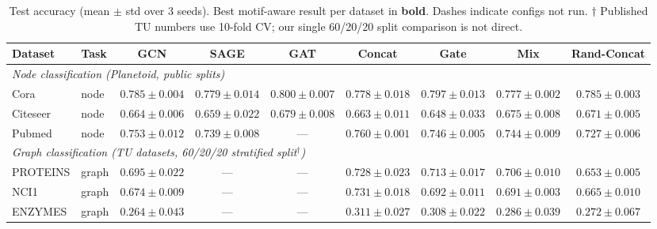 
\begin{table}[t]
\centering
\caption{Test accuracy (mean $\pm$ std over 3 seeds). Best motif-aware result per dataset in \textbf{bold}. Dashes indicate configs not run. $\dagger$ Published TU numbers use 10-fold CV; our single 60/20/20 split comparison is not direct.}
\label{tab:main_results}
\setlength{\tabcolsep}{4pt}
\begin{tabular}{llccccccc}
\toprule
\textbf{Dataset} & \textbf{Task} & \textbf{GCN} & \textbf{SAGE} & \textbf{GAT} & \textbf{Concat} & \textbf{Gate} & \textbf{Mix} & \textbf{Rand-Concat} \\
\midrule
\multicolumn{9}{l}{\textit{Node classification (Planetoid, public splits)}} \\
Cora      & node  & $0.785\pm0.004$ & $0.779\pm0.014$ & $0.800\pm0.007$ & $0.778\pm0.018$ & $\mathbf{0.797}\pm0.013$ & $0.777\pm0.002$ & $0.785\pm0.003$ \\
Citeseer  & node  & $0.664\pm0.006$ & $0.659\pm0.022$ & $0.679\pm0.008$ & $0.663\pm0.011$ & $0.648\pm0.033$ & $\mathbf{0.675}\pm0.008$ & $0.671\pm0.005$ \\
Pubmed    & node  & $0.753\pm0.012$ & $0.739\pm0.008$ & ---             & $\mathbf{0.760}\pm0.001$ & $0.746\pm0.005$ & $0.744\pm0.009$ & $0.727\pm0.006$ \\
\midrule
\multicolumn{9}{l}{\textit{Graph classification (TU datasets, 60/20/20 stratified split$^\dagger$)}} \\
PROTEINS  & graph & $0.695\pm0.022$ & ---             & ---             & $\mathbf{0.728}\pm0.023$ & $0.713\pm0.017$ & $0.706\pm0.010$ & $0.653\pm0.005$ \\
NCI1      & graph & $0.674\pm0.009$ & ---             & ---             & $\mathbf{0.731}\pm0.018$ & $0.692\pm0.011$ & $0.691\pm0.003$ & $0.665\pm0.010$ \\
ENZYMES   & graph & $0.264\pm0.043$ & ---             & ---             & $\mathbf{0.311}\pm0.027$ & $0.308\pm0.022$ & $0.286\pm0.039$ & $0.272\pm0.067$ \\
\bottomrule
\end{tabular}
\end{table}


